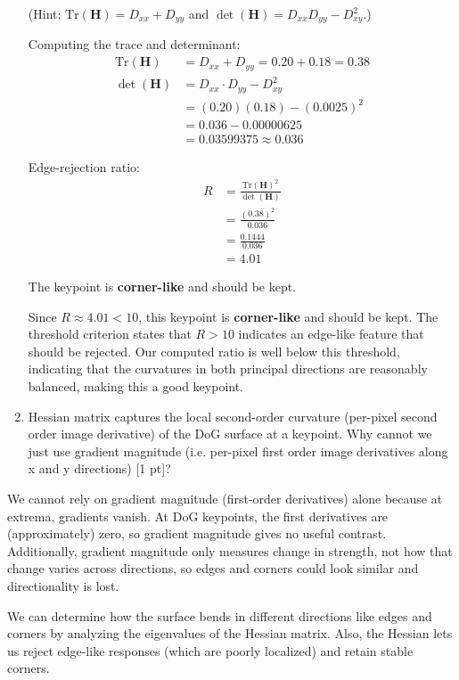 \documentclass[12pt,a4paper]{article}
\begin{document}
\begin{enumerate}
(Hint: $\mathrm{Tr}(\mathbf H)=D_{xx}+D_{yy}$ and $\det(\mathbf H)=D_{xx}D_{yy}-D_{xy}^2$.)

Computing the trace and determinant:
\begin{align*}
\mathrm{Tr}(\mathbf{H}) &= D_{xx} + D_{yy} = 0.20 + 0.18 = 0.38\\[6pt]
\det(\mathbf{H}) &= D_{xx} \cdot D_{yy} - D_{xy}^2\\
&= (0.20)(0.18) - (0.0025)^2\\
&= 0.036 - 0.00000625\\
&= 0.03599375 \approx 0.036
\end{align*}

Edge-rejection ratio:
\begin{align*}
R &= \frac{\mathrm{Tr}(\mathbf{H})^2}{\det(\mathbf{H})}\\[6pt]
&= \frac{(0.38)^2}{0.036}\\[6pt]
&= \frac{0.1444}{0.036}\\[6pt]
&= 4.01
\end{align*}

The keypoint is \textbf{corner-like} and should be kept.

Since $R \approx 4.01 < 10$, this keypoint is \textbf{corner-like} and should be kept. The threshold criterion states that $R > 10$ indicates an edge-like feature that should be rejected. Our computed ratio is well below this threshold, indicating that the curvatures in both principal directions are reasonably balanced, making this a good keypoint.


    \item Hessian matrix captures the local second-order curvature (per-pixel second order image derivative) of the DoG surface at a keypoint. Why cannot we just use gradient magnitude (i.e. per-pixel first order image derivatives along x and y directions) [1 pt]?
\end{enumerate}

We cannot rely on gradient magnitude (first-order derivatives) alone because at extrema, gradients vanish. At DoG keypoints, the first derivatives are (approximately) zero, 
so gradient magnitude gives no useful contrast. Additionally, gradient magnitude only measures change in strength, not how that change varies across directions, so edges and 
corners could look similar and directionality is lost.

We can determine how the surface bends in different directions like edges and corners by analyzing the eigenvalues of the Hessian matrix.
Also, the Hessian lets us reject edge-like responses (which are poorly localized) and retain stable corners.
\end{document}
